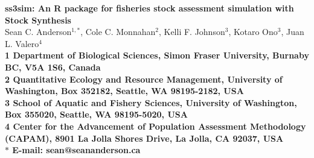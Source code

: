 \documentclass[11pt]{article}
\date{}
\begin{document}
\begin{flushleft}
{\Large
\textbf{ss3sim: An \textsf{R} package for fisheries stock assessment simulation with Stock Synthesis}
}
\\
Sean C. Anderson$^{1,\ast}$,
Cole C. Monnahan$^{2}$,
Kelli F. Johnson$^{3}$,
Kotaro Ono$^{3}$,
Juan L. Valero$^{4}$
\\
\bf{1} Department of Biological Sciences,
Simon Fraser University,
Burnaby BC, V5A 1S6, Canada
\\
\bf{2} Quantitative Ecology and Resource Management,
University of Washington, Box 352182,
Seattle, WA 98195-2182, USA
\\
\bf{3} School of Aquatic and Fishery Sciences,
University of Washington, Box 355020,
Seattle, WA 98195-5020, USA
\\
\bf{4} Center for the Advancement of Population Assessment Methodology
(CAPAM), 8901 La Jolla Shores Drive, La Jolla, CA 92037, USA
\\
$\ast$ E-mail: sean@seananderson.ca
\end{flushleft}


\linenumbers
\modulolinenumbers[1]



\nolinenumbers
\setlength\parskip{0.11in}
\setlength\parindent{0in}
\setcounter{page}{1}

\makeatletter
\renewcommand\@seccntformat[1]{}
\makeatother

\clearpage

\onehalfspacing




\end{document}
